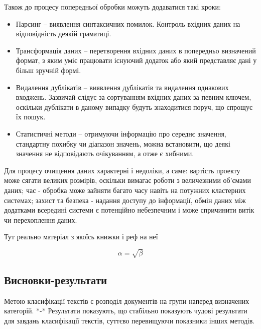 Також до процесу попередньої обробки можуть додаватися такі кроки:
\begin{itemize}
	\item Парсинг – виявлення синтаксичних помилок. Контроль вхідних даних на відповідність деякій граматиці.
	\item Трансформація даних – перетворення вхідних даних в попередньо визначений формат, з яким уміє працювати існуючий додаток або який представляє дані у більш зручній формі.
	\item Видалення дублікатів – виявлення дублікатів та видалення однакових входжень. Зазвичай слідує за сортуванням вхідних даних за певним ключем, оскільки дублікати в даному випадку будуть знаходитися поруч, що спрощує їх пошук.
	\item Статистичні методи – отримуючи інформацію про середнє значення, стандартну похибку чи діапазон значень, можна встановити, що деякі значення не відповідають очікуванням, а отже є хибними.
\end{itemize}

Для процесу очищення даних характерні і недоліки, а саме: вартість проекту може сягати великих розмірів, оскільки вимагає роботи з величезними об'ємами даних; час - обробка може зайняти багато часу навіть на потужних кластерних системах; захист та безпека - надання доступу до інформації, обмін даних між додатками всередині системи є потенційно небезпечним і може спричинити витік чи перехоплення даних.

Тут реально матеріал з якоїсь книжки і реф на неї \cite{book:1}



\begin{equation}
    \label{simple_equation}
    \alpha = \sqrt{ \beta }
\end{equation}

\subsection{Висновки-результати}
Метою класифікації текстів є розподіл документів на групи наперед визначених категорій. *-*
Результати показують, що стабільно показують чудові результати для завдань класифікації
текстів, суттєво перевищуючи показники інших методів.

